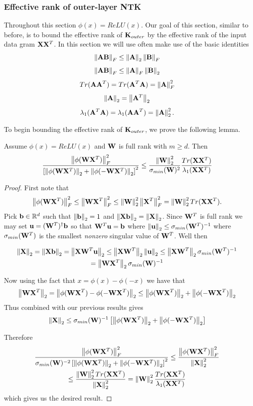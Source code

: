 \subsubsection{Effective rank of outer-layer NTK}\label{sec:eff_rank_outer}
Throughout this section $\phi(x) = ReLU(x)$.  Our goal of this section, similar to before, is to bound the effective rank of $\mK_{outer}$ by the effective rank of the input data gram $\mX \mX^T$.  In this section we will use often make use of the basic identities
\[ \norm{\mathbf{A} \mathbf{B}}_F \leq \norm{\mathbf{A}}_2 \norm{\mathbf{B}}_F \]
\[ \norm{\mathbf{A} \mathbf{B}}_F \leq \norm{\mathbf{A}}_F \norm{\mathbf{B}}_2 \]
\[ Tr(\mathbf{A} \mathbf{A}^T) = Tr(\mathbf{A}^T \mathbf{A}) = \norm{\Ab}_F^2 \]
\[ \norm{\mathbf{A}}_2 = \norm{\mathbf{A}^T}_2\]
\[ \lambda_1(\Ab^T \Ab) = \lambda_1(\Ab \Ab^T) = \norm{\Ab}_2^2. \]

To begin bounding the effective rank of $\mK_{outer}$, we prove the following lemma.
\begin{lemma}\label{lem:outer_annoying_bound}
Assume $\phi(x) = ReLU(x)$ and $\Wb$ is full rank with $m \geq d$.  Then
\[\frac{\norm{\phi(\Wb \Xb^T)}_F^2}{\brackets{\norm{\phi(\Wb \Xb^T)}_2 + \norm{\phi(-\Wb \Xb^T)}_2}^2} \leq \frac{\norm{\Wb}_2^2}{\sigma_{min}(\Wb)^2} \frac{Tr(\Xb \Xb^T)}{\lambda_1(\Xb \Xb^T)}\]
\end{lemma}
\begin{proof}
First note that
\[ \norm{\phi(\Wb \Xb^T)}_F^2 \leq \norm{\Wb \Xb^T}_F^2 \leq \norm{\Wb}_2^2 \norm{\Xb^T}_F^2 = \norm{\Wb}_2^2 Tr(\Xb \Xb^T). \]
Pick $\vb \in \RR^d$ such that $\norm{\vb}_2 = 1$ and $\norm{\Xb \vb}_2 = \norm{\Xb}_2$.  Since $\Wb^T$ is full rank we may set $\mathbf{u} = (\Wb^T)^\dagger \vb$ so that $\Wb^T \mathbf{u} = \vb$ where $\norm{\mathbf{u}}_2 \leq \sigma_{min}(\Wb^T)^{-1}$ where $\sigma_{min}(\Wb^T)$ is the smallest \textit{nonzero} singular value of $\Wb^T$.  Well then

\begin{gather*}
\norm{\Xb}_2 = \norm{\Xb \vb}_2 = \norm{\Xb \Wb^T \mathbf{u}}_2 \leq \norm{\Xb \Wb^T}_2 \norm{\mathbf{u}}_2 \leq \norm{\Xb \Wb^T}_2 \sigma_{min}(\Wb^T)^{-1} \\
= \norm{\Wb \Xb^T}_2 \sigma_{min}(\Wb)^{-1}  
\end{gather*}

Now using the fact that $x = \phi(x) - \phi(-x)$ we have that
\[ \norm{\Wb \Xb^T}_2 = \norm{\phi(\Wb \Xb^T) - \phi(-\Wb \Xb^T)}_2 \leq \norm{\phi(\Wb \Xb^T)}_2 + \norm{\phi(-\Wb \Xb^T)}_2 \]
Thus combined with our previous results gives
\[\norm{\Xb}_2 \leq \sigma_{min}(\Wb)^{-1} \brackets{\norm{\phi(\Wb \Xb^T)}_2 + \norm{\phi(-\Wb \Xb^T)}_2}  \]

Therefore
\begin{gather*}
\frac{\norm{\phi(\Wb \Xb^T)}_F^2 }{\sigma_{min}(\Wb)^{-2} \brackets{\norm{\phi(\Wb \Xb^T)}_2 + \norm{\phi(-\Wb \Xb^T)}_2}^2} \leq \frac{\norm{\phi(\Wb \Xb^T)}_F^2 }{\norm{\Xb}_2^2} \\
\leq \frac{\norm{\Wb}_2^2 Tr(\Xb \Xb^T)}{\norm{\Xb}_2^2} = \norm{\Wb}_2^2 \frac{Tr(\Xb \Xb^T)}{\lambda_1(\Xb \Xb^T)}
\end{gather*}
which gives us the desired result.
\end{proof}

